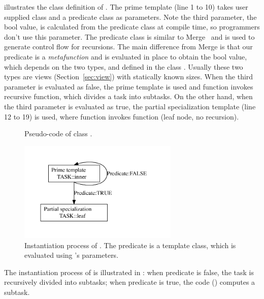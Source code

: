  illustrates the class definition of . The
prime template (line 1 to 10) takes  user supplied 
class and a predicate class as parameters. Note the third parameter, the bool value,
is calculated from the predicate class at compile time, so programmers don't
use this parameter. 
The predicate class is similar to Merge~\cite{merge} and is used to generate
control flow for recursions. The main difference from Merge is that our predicate is a
\emph{metafunction} and is evaluated in place to obtain the bool value, which
depends on the two types,  and 
defined in the class . Usually these two types are views (Section~\ref{sec:view})
with statically known sizes. When the third parameter is evaluated as false, the
prime template is used and  function invokes recursive
 function, which divides a task into subtasks.
On the other hand, when the third parameter is evaluated as true, the partial
specialization template (line 12 to 19) is used, where  function
invokes  function (leaf node, no recursion).


\begin{figure}[hbt]
  \caption{Pseudo-code of class .}
  \label{fig:tf:code}
\end{figure}

\begin{figure}[hpt]
  \includegraphics[width=3.0in]{../algo}
  \caption{Instantiation process of . The predicate is a template
class, which is evaluated using 's parameters.}
  \label{fig:hierarchy}
\end{figure}

The instantiation process of  is illustrated in :
when predicate is false, the task is recursively divided into subtasks; when predicate
is true, the code () computes a subtask.


